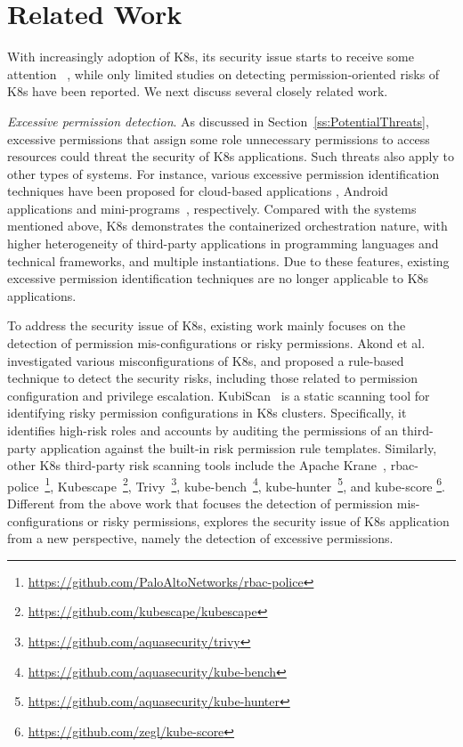\documentclass[conference]{IEEEtran}
\theoremstyle{definition}
\begin{document}
\section{Related Work} 
\label{sec:rw}

With increasingly adoption of K8s, its security issue starts to receive some attention
~\cite{KGSecConfig22,k8smanifests2023,yang2023take}, while only limited studies on detecting permission-oriented risks of K8s have been reported. We next discuss several closely related work.

\textit{Excessive permission detection}. As discussed in Section~\ref{ss:PotentialThreats}, excessive permissions that assign some role unnecessary permissions to access resources could threat the security of K8s applications. Such threats also apply to other types of systems. For instance, various excessive permission identification techniques have been proposed for cloud-based applications  \cite{o1995redundant,molloy2012generative,sanders2018minimizing}, Android applications \cite{au2012pscout,johnson2012analysis,jiang2018reddroid,xiao2020android,felt2011android,bartel2014static} and mini-programs~\cite{wang2024minichecker,zhang2023small}, respectively. Compared with the systems mentioned above, K8s demonstrates the containerized orchestration nature, with higher heterogeneity of third-party applications in programming languages and technical frameworks, and multiple instantiations. Due to these features, existing excessive permission identification techniques are no longer applicable to K8s applications. 

To address the security issue of K8s, existing work mainly focuses on the detection of permission mis-configurations or risky permissions. Akond et al.~\cite{k8smanifests2023} investigated various misconfigurations of K8s, and proposed a rule-based technique to detect the security risks, including those related to permission configuration and privilege escalation. KubiScan~\cite{kubiscan2024} is a static scanning tool for identifying risky permission configurations in K8s clusters. Specifically, it identifies high-risk roles and accounts by auditing  the permissions of an third-party application against the built-in risk permission rule templates. Similarly, other K8s third-party risk scanning tools include the Apache Krane~\cite{krane2024}, rbac-police~\footnote{\url{https://github.com/PaloAltoNetworks/rbac-police}}, Kubescape~\footnote{\url{https://github.com/kubescape/kubescape}}, Trivy~\footnote{\url{https://github.com/aquasecurity/trivy}}, kube-bench~\footnote{\url{https://github.com/aquasecurity/kube-bench}}, kube-hunter~\footnote{\url{https://github.com/aquasecurity/kube-hunter}}, and kube-score \footnote{\url{https://github.com/zegl/kube-score}}.
Different from the above work that focuses the detection of permission mis-configurations or risky permissions, \kg explores the security issue of K8s application from a new perspective, namely the detection of excessive permissions.  
\end{document}
